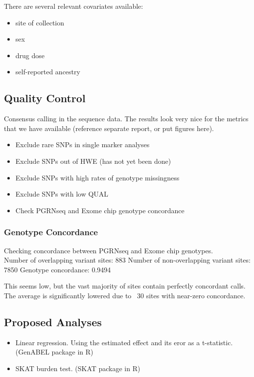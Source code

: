 \documentclass[paper=a4, fontsize=11pt]{scrartcl}	%
\numberwithin{equation}{section}		%
\numberwithin{figure}{section}			%
\numberwithin{table}{section}				%
\begin{document}
There are several relevant covariates available:
	\begin{itemize}
		\item site of collection
		\item sex
		\item drug dose
		\item self-reported ancestry
	\end{itemize}

	\subsection{Quality Control}
	Consensus calling in the sequence data. The results look very nice for the metrics that we have available (reference separate report, or put figures here).
	
	\begin{itemize}
		\item Exclude rare SNPs in single marker analyses
		\item Exclude SNPs out of HWE (has not yet been done)
		\item Exclude SNPs with high rates of genotype missingness
		\item Exclude SNPs with low QUAL
		\item Check PGRNseq and Exome chip genotype concordance
	\end{itemize}

	\subsubsection{Genotype Concordance}
	Checking concordance between PGRNseq and Exome chip genotypes. \\
	
	Number of overlapping variant sites: 883
	Number of non-overlapping variant sites: 7850
	Genotype concordance: 0.9494
	
	This seems low, but the vast majority of sites contain perfectly concordant calls. The average is significantly lowered due to ~30 sites with near-zero concordance. 
	
	\subsection{Proposed Analyses}
	\begin{itemize}
		\item Linear regression. Using the estimated effect and its eror as a t-statistic. (GenABEL package in R)
		\item SKAT burden test. (SKAT package in R)
	\end{itemize}
	
\end{document}
